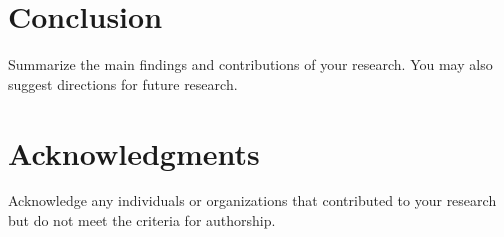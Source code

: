 \documentclass[conference]{IEEEtran}
\begin{document}
\section{Conclusion}
Summarize the main findings and contributions of your research. You may also suggest directions for future research.

\section*{Acknowledgments}
Acknowledge any individuals or organizations that contributed to your research but do not meet the criteria for authorship.

\end{document}
